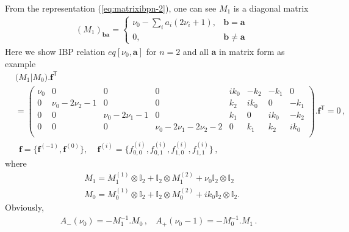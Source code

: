 \documentclass[a4paper,11pt]{article}
\newcommand{\nn}{\nonumber}
\def\eqref#1{(\ref{#1})}
\begin{document}

From the representation \eqref{eq:matrixibpn-2}, one can see $M_1$ is a diagonal matrix
\begin{align}
&\left(M_1\right)_{\bm{b}\bm{a}}= \begin{cases}
\nu_0-\sum_i a_i(2\nu_i+1) , & \bm{b}=\bm{a} \\
0, & \bm{b}\neq \bm{a}
\end{cases} 
\end{align} 
Here we show IBP relation $eq[\nu_0,\bm{a}]$ for $n=2$ and all $\bm{a}$ in matrix form as example
\begin{align}
&\Big(M_1 \Big| M_0 \Big).\bm{f}^{\mathsf{T}}\nn\\
&=\left(
\begin{array}{cccc|cccc}
 \nu _0 & 0 & 0 & 0 & i k_0 & -k_2 & -k_1 & 0 \\
 0 & \nu _0-2 \nu _2-1 & 0 & 0 & k_2 & i k_0 & 0 & -k_1 \\
 0 & 0 & \nu _0-2 \nu _1-1 & 0 & k_1 & 0 & i k_0 & -k_2 \\
 0 & 0 & 0 & \nu _0-2 \nu _1-2 \nu _2-2 & 0 & k_1 & k_2 & i k_0 \\
\end{array}
\right).\bm{f}^{\mathsf{T}}=0\, ,\nn\\
&~~\bm{f}=\{\bm{f}^{(-1)},\bm{f}^{(0)}\},~~~~~\bm{f}^{(i)}=\{f^{(i)}_{0,0},f^{(i)}_{0,1},f^{(i)}_{1,0},f^{(i)}_{1,1}\}\, ,
\end{align} 
where 
\begin{align}
&M_1=M^{(1)}_1 \otimes \mathbb{I}_2 + \mathbb{I}_2 \otimes M^{(2)}_1 + \nu_0 \mathbb{I}_2 \otimes \mathbb{I}_2 \nn\\
&M_0=M^{(1)}_0 \otimes \mathbb{I}_2 + \mathbb{I}_2 \otimes M^{(2)}_0 + i k_0 \mathbb{I}_2 \otimes \mathbb{I}_2.
\end{align}
Obviously, 
\begin{align}
A_-(\nu_0)=-M_1^{-1}.M_0\, , ~~~~A_+(\nu_0-1)=-M_0^{-1}.M_1\,.
\end{align}
\end{document}

